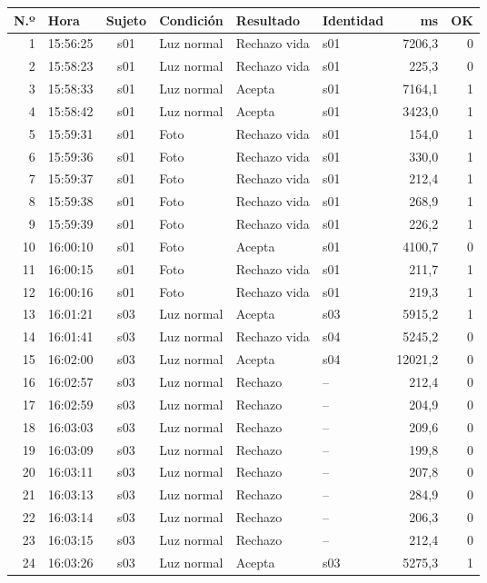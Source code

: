 \begin{tabular}{rlclllrr}\toprule N.º & Hora & Sujeto & Condición & Resultado & Identidad & ms & OK \\ \midrule
1 & 15:56:25 & s01 & Luz normal & Rechazo vida & s01 & 7206,3 & 0 \\
2 & 15:58:23 & s01 & Luz normal & Rechazo vida & s01 & 225,3 & 0 \\
3 & 15:58:33 & s01 & Luz normal & Acepta & s01 & 7164,1 & 1 \\
4 & 15:58:42 & s01 & Luz normal & Acepta & s01 & 3423,0 & 1 \\
5 & 15:59:31 & s01 & Foto & Rechazo vida & s01 & 154,0 & 1 \\
6 & 15:59:36 & s01 & Foto & Rechazo vida & s01 & 330,0 & 1 \\
7 & 15:59:37 & s01 & Foto & Rechazo vida & s01 & 212,4 & 1 \\
8 & 15:59:38 & s01 & Foto & Rechazo vida & s01 & 268,9 & 1 \\
9 & 15:59:39 & s01 & Foto & Rechazo vida & s01 & 226,2 & 1 \\
10 & 16:00:10 & s01 & Foto & Acepta & s01 & 4100,7 & 0 \\
11 & 16:00:15 & s01 & Foto & Rechazo vida & s01 & 211,7 & 1 \\
12 & 16:00:16 & s01 & Foto & Rechazo vida & s01 & 219,3 & 1 \\
13 & 16:01:21 & s03 & Luz normal & Acepta & s03 & 5915,2 & 1 \\
14 & 16:01:41 & s03 & Luz normal & Rechazo vida & s04 & 5245,2 & 0 \\
15 & 16:02:00 & s03 & Luz normal & Acepta & s04 & 12021,2 & 0 \\
16 & 16:02:57 & s03 & Luz normal & Rechazo & -- & 212,4 & 0 \\
17 & 16:02:59 & s03 & Luz normal & Rechazo & -- & 204,9 & 0 \\
18 & 16:03:03 & s03 & Luz normal & Rechazo & -- & 209,6 & 0 \\
19 & 16:03:09 & s03 & Luz normal & Rechazo & -- & 199,8 & 0 \\
20 & 16:03:11 & s03 & Luz normal & Rechazo & -- & 207,8 & 0 \\
21 & 16:03:13 & s03 & Luz normal & Rechazo & -- & 284,9 & 0 \\
22 & 16:03:14 & s03 & Luz normal & Rechazo & -- & 206,3 & 0 \\
23 & 16:03:15 & s03 & Luz normal & Rechazo & -- & 212,4 & 0 \\
24 & 16:03:26 & s03 & Luz normal & Acepta & s03 & 5275,3 & 1 \\
\bottomrule\end{tabular}